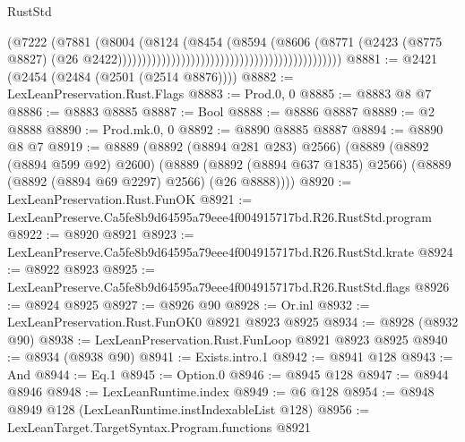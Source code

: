 \begin{lexlean}{RustStd}
\begin{coremodule}
                                                                            (@7222
                                                                              (@7881
                                                                                (@8004
                                                                                  (@8124
                                                                                    (@8454
                                                                                      (@8594
                                                                                        (@8606
                                                                                          (@8771
                                                                                            (@2423
                                                                                              (@8775
                                                                                                @8827)
                                                                                              (@26
                                                                                                @2422))))))))))))))))))))))))))))))))))))))))))))))
@8881 := @2421 (@2454 (@2484 (@2501 (@2514 @8876))))
@8882 := LexLeanPreservation.Rust.Flags
@8883 := Prod.{0, 0}
@8885 := @8883 @8 @7
@8886 := @8883 @8885
@8887 := Bool
@8888 := @8886 @8887
@8889 := @2 @8888
@8890 := Prod.mk.{0, 0}
@8892 := @8890 @8885 @8887
@8894 := @8890 @8 @7
@8919 := @8889
    (@8892 (@8894 @281 @283) @2566)
    (@8889
      (@8892 (@8894 @599 @92) @2600)
      (@8889 (@8892 (@8894 @637 @1835) @2566) (@8889 (@8892 (@8894 @69 @2297) @2566) (@26 @8888))))
@8920 := LexLeanPreservation.Rust.FunOK
@8921 := LexLeanPreserve.Ca5fe8b9d64595a79eee4f004915717bd.R26.RustStd.program
@8922 := @8920 @8921
@8923 := LexLeanPreserve.Ca5fe8b9d64595a79eee4f004915717bd.R26.RustStd.krate
@8924 := @8922 @8923
@8925 := LexLeanPreserve.Ca5fe8b9d64595a79eee4f004915717bd.R26.RustStd.flags
@8926 := @8924 @8925
@8927 := @8926 @90
@8928 := Or.inl
@8932 := LexLeanPreservation.Rust.FunOK0 @8921 @8923 @8925
@8934 := @8928 (@8932 @90)
@8938 := LexLeanPreservation.Rust.FunLoop @8921 @8923 @8925
@8940 := @8934 (@8938 @90)
@8941 := Exists.intro.{1}
@8942 := @8941 @128
@8943 := And
@8944 := Eq.{1}
@8945 := Option.{0}
@8946 := @8945 @128
@8947 := @8944 @8946
@8948 := LexLeanRuntime.index
@8949 := @6 @128
@8954 := @8948 @8949 @128 (LexLeanRuntime.instIndexableList @128)
@8956 := LexLeanTarget.TargetSyntax.Program.functions @8921

\end{coremodule}
\end{lexlean}
